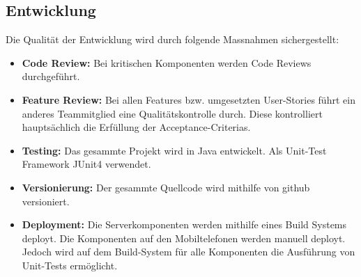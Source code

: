 \subsection{Entwicklung}
Die Qualität der Entwicklung wird durch folgende Massnahmen sichergestellt:
\begin{itemize}
	\item{\textbf{Code Review:} Bei kritischen Komponenten werden Code Reviews durchgeführt.}
	
	\item{\textbf{Feature Review:} Bei allen Features bzw. umgesetzten User-Stories führt ein anderes Teammitglied eine Qualitätskontrolle durch. Diese kontrolliert hauptsächlich die Erfüllung der Acceptance-Criterias.}
	
	\item{\textbf{Testing:} Das gesammte Projekt wird in Java entwickelt. Als Unit-Test Framework JUnit4 verwendet.}
	
	\item{\textbf{Versionierung:} Der gesammte Quellcode wird mithilfe von github versioniert.}
	
	\item{\textbf{Deployment:} Die Serverkomponenten werden mithilfe eines Build Systems deployt. Die Komponenten auf den Mobiltelefonen werden manuell deployt. Jedoch wird auf dem Build-System für alle Komponenten die Ausführung von Unit-Tests ermöglicht.}
	
\end{itemize}